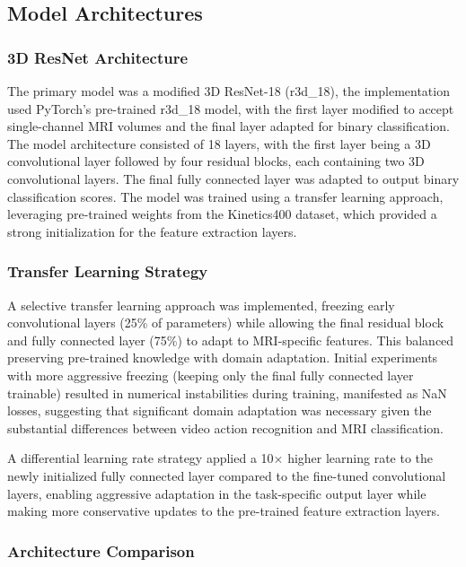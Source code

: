 \documentclass[12pt, a4paper]{article}
\begin{document}
\subsection{Model Architectures}
\subsubsection{3D ResNet Architecture}

The primary model was a modified 3D ResNet-18 (r3d\_18), the implementation used PyTorch's pre-trained r3d\_18 model, with the first layer modified to accept single-channel MRI volumes and the final layer adapted for binary classification. The model architecture consisted of 18 layers, with the first layer being a 3D convolutional layer followed by four residual blocks, each containing two 3D convolutional layers. The final fully connected layer was adapted to output binary classification scores. The model was trained using a transfer learning approach, leveraging pre-trained weights from the Kinetics400 dataset, which provided a strong initialization for the feature extraction layers.

\subsubsection{Transfer Learning Strategy}

A selective transfer learning approach was implemented, freezing early convolutional layers (25\% of parameters) while allowing the final residual block and fully connected layer (75\%) to adapt to MRI-specific features. This balanced preserving pre-trained knowledge with domain adaptation. Initial experiments with more aggressive freezing (keeping only the final fully connected layer trainable) resulted in numerical instabilities during training, manifested as NaN losses, suggesting that significant domain adaptation was necessary given the substantial differences between video action recognition and MRI classification.

A differential learning rate strategy applied a 10× higher learning rate to the newly initialized fully connected layer compared to the fine-tuned convolutional layers, enabling aggressive adaptation in the task-specific output layer while making more conservative updates to the pre-trained feature extraction layers.

\subsubsection{Architecture Comparison}
\end{document}
